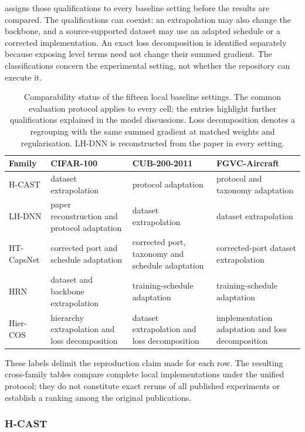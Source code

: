  assigns those qualifications to every baseline
setting before the results are compared. The qualifications can coexist: an
extrapolation may also change the backbone, and a source-supported dataset may
use an adapted schedule or a corrected implementation. An exact loss
decomposition is identified separately because exposing level terms need not
change their summed gradient. The classifications concern the experimental
setting, not whether the repository can execute it.

\begin{table}[htbp]
\centering
\caption{Comparability status of the fifteen local baseline settings. The common
evaluation protocol applies to every cell; the entries highlight further
qualifications explained in the model discussions. Loss decomposition denotes
a regrouping with the same summed gradient at matched weights and regularisation.
LH-DNN is reconstructed from the paper in every setting.}
\label{tab:fidelity_status}
\experimenttablesetup
\begin{tabularx}{\linewidth}{@{}L{2.2cm}YYY@{}}
\toprule
\textbf{Family} & \textbf{CIFAR-100} & \textbf{CUB-200-2011} & \textbf{FGVC-Aircraft} \\
\midrule
H-CAST & dataset extrapolation & protocol adaptation & protocol and taxonomy adaptation \\
LH-DNN & paper reconstruction and protocol adaptation & dataset extrapolation & dataset extrapolation \\
HT-CapsNet & corrected port and schedule adaptation & corrected port, taxonomy and schedule adaptation & corrected-port dataset extrapolation \\
HRN & dataset and backbone extrapolation & training-schedule adaptation & training-schedule adaptation \\
Hier-COS & hierarchy extrapolation and loss decomposition & dataset extrapolation and loss decomposition & implementation adaptation and loss decomposition \\
\bottomrule
\end{tabularx}
\end{table}

These labels delimit the reproduction claim made for each row. The resulting
cross-family tables compare complete local implementations under the unified
protocol; they do not constitute exact reruns of all published experiments or
establish a ranking among the original publications.

\subsubsection{H-CAST}
\label{sssec:fidelity_hcast}

